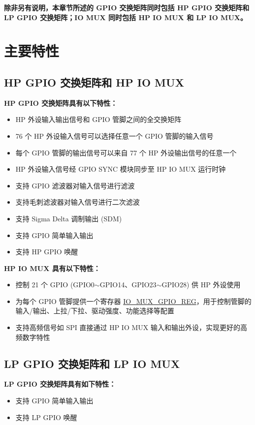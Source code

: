 \documentclass[main\_\_CN.tex]{subfiles}
\begin{document}
\textbf{除非另有说明，本章节所述的 GPIO 交换矩阵同时包括 HP GPIO 交换矩阵和 LP GPIO 交换矩阵；IO MUX 同时包括 HP IO MUX 和 LP IO MUX。}

\section{主要特性}
\subsection{HP GPIO 交换矩阵和 HP IO MUX}
\textbf{HP GPIO 交换矩阵具有以下特性：}
\begin{itemize}
\item HP 外设输入输出信号和 GPIO 管脚之间的全交换矩阵
\item 76 个 HP 外设输入信号可以选择任意一个 GPIO 管脚的输入信号
\item 每个 GPIO 管脚的输出信号可以来自 77 个 HP 外设输出信号的任意一个
\item HP 外设输入信号经 GPIO SYNC 模块同步至 HP IO MUX 运行时钟
\item 支持 GPIO 滤波器对输入信号进行滤波
\item 支持毛刺滤波器对输入信号进行二次滤波
\item 支持 Sigma Delta 调制输出 (SDM)
\item 支持 GPIO 简单输入输出
\item 支持 HP GPIO 唤醒
\end{itemize}

\textbf{HP IO MUX 具有以下特性：}
\begin{itemize}
\item 控制 21 个 GPIO (GPIO0$\sim$GPIO14、GPIO23$\sim$GPIO28) 供 HP 外设使用
\item 为每个 GPIO 管脚提供一个寄存器 \hyperref[regdesc:IOMUXGPIONREG]{IO\_MUX\_GPIO\_REG}，用于控制管脚的输入/输出、上拉/下拉、驱动强度、功能选择等配置
\item 支持高频信号如 SPI 直接通过 HP IO MUX 输入和输出外设，实现更好的高频数字特性
\end{itemize}

\subsection{LP GPIO 交换矩阵和 LP IO MUX}

\textbf{LP GPIO 交换矩阵具有如下特性：}
\begin{itemize}
\item 支持 GPIO 简单输入输出
\item 支持 LP GPIO 唤醒
\end{itemize}
\end{document}
